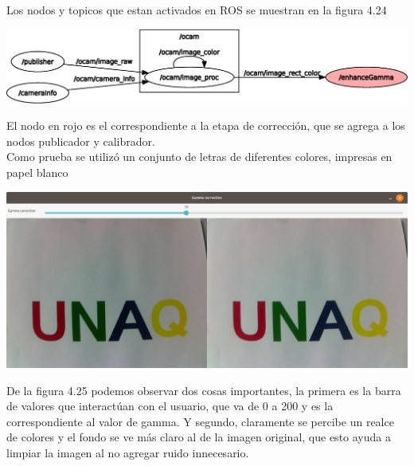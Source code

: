 Los nodos y topicos que estan activados en ROS se muestran en la figura 4.24
\begin{center}
	\includegraphics[width=1.0 \textwidth]{Contenido/Cuerpo/Capitulo4/Fig14.eps}
	\label{Fig9}
\end{center}
El nodo en rojo es el correspondiente a la etapa de corrección, que se agrega a los nodos
publicador y calibrador.\\
Como prueba se utilizó un conjunto de letras de diferentes colores, impresas en papel blanco
\begin{center}
	\includegraphics[width=0.85 \textwidth]{Contenido/Cuerpo/Capitulo4/Fig13.eps}
	\label{Fig9}
\end{center}
De la figura 4.25 podemos observar dos cosas importantes, la primera es la barra de valores
que interactúan con el usuario, que va de 0 a 200 y es la correspondiente al valor de gamma. Y
segundo, claramente se percibe un realce de colores y el fondo se ve más claro al de la imagen original, que esto
ayuda a limpiar la imagen al no agregar ruido innecesario.



